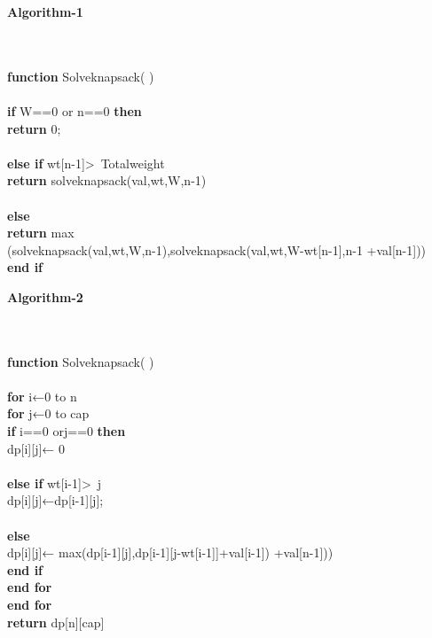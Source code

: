 \documentclass[twocolumn]{article}
\begin{document}
\centerline{\textbf{Algorithm-1}}\\
\vspace{7px}
\hline
\vspace{10px}
\nointend\\
\textbf{function}  Solveknapsack( )\\
\\
   \noindent    \textbf{\qquad if}\: \:W==0 \:or\: n==0\:
	\textbf{then} \\
         \textbf{return }  0;\\
         \\
         \textbf{\qquad else if} wt[n-1]\textgreater \ Totalweight\\
            \textbf{return }  solveknapsack(val,wt,W,n-1)\\
            \\
    \textbf{\qquad else}\\
         \textbf{return } max\\(solveknapsack(val,wt,W,n-1),solveknapsack(val,wt,W-wt[n-1],n-1
+val[n-1]))\\
 \textbf{\qquad end if}
\\
\hline
\vfill\eject
\centerline{\textbf{Algorithm-2}}\\
\vspace{3px}
\hline
\vspace{6px}
\noindent  \\
\textbf{function}  Solveknapsack( )\\
\\
\textbf{for} i←0 to n\\
\textbf{for} j←0 to cap\\
   \noindent    \textbf{\qquad if}\: \:i==0 \:or\:j==0\:
	\textbf{then} \\
         dp[i][j]← 0\\
\noindent  
         \\
         \textbf{\qquad else if} wt[i-1]\textgreater \ j
 \noindent     \\     
           dp[i][j]←dp[i-1][j];\\
            \\
            \noindent  
    \textbf{\qquad else}\\
        dp[i][j]← max(dp[i-1][j],dp[i-1][j-wt[i-1]]+val[i-1])
+val[n-1]))\\
 \textbf{\qquad end if}\\
\textbf{end for}\\
\textbf{end for}\\
\textbf{return} dp[n][cap]\\
 \vspace{1px}
 \hline
\end{document}

